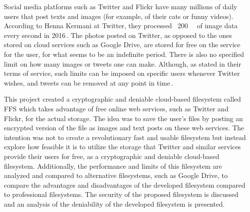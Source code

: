 Social media platforms such as Twitter and Flickr have many millions of daily users that post texts and images (for example, of their cats or funny videos). According to Henna Kermani at Twitter, they processed ~\SI{200}{\giga\byte} of image data every second in 2016\,\cite{MobileScaleLondona}. The photos posted on Twitter, as opposed to the ones stored on cloud services such as Google Drive, are stored for free on the service for the user, for what seems to be an indefinite period. There is also no specified limit on how many images or tweets one can make. Although, as stated in their terms of service, such limits can be imposed on specific users whenever Twitter wishes, and tweets can be removed at any point in time\,\cite{twitterTwitterTermsService2021}.

This project created a cryptographic and deniable \mbox{cloud-based} filesystem called \gls{FFS} which takes advantage of free online web services, such as Twitter and Flickr, for the actual storage. The idea was to save the user's files by posting an encrypted version of the file as images and text posts on these web services. The intention was not to create a revolutionary fast and usable filesystem but instead explore how feasible it is to utilize the storage that Twitter and similar services provide their users for free, as a cryptographic and deniable \mbox{cloud-based} filesystem. Additionally, the performance and limits of this filesystem are analyzed and compared to alternative filesystems, such as Google Drive, to compare the advantages and disadvantages of the developed filesystem compared to professional filesystems. The security of the proposed filesystem is discussed and an analysis of the deniability of the developed filesystem is presented.











